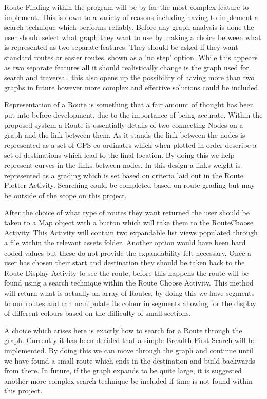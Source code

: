 Route Finding within the program will be by far the most complex feature to implement. This is down to a variety of reasons including having to implement a search technique which performs reliably. Before any graph analysis is done the user should select
 what graph they want to use by making a choice between what is represented as two separate features. They should be asked if they want standard routes or easier routes, shown as a 'no step' option. While this appears as two separate features all it should realistically change is the graph used for search and traversal, this also opens up the possibility of having more than two graphs in future however more complex and effective solutions could be included. 
 
Representation of a Route is something that a fair amount of thought has been put into before development, due to the importance of being accurate. Within the proposed system a Route is essentially details of two connecting Nodes on a graph and the link between them. As it stands the link between the nodes is represented as a set of GPS co ordinates which when plotted in order describe a set of destinations which lead to the final location. By doing this we help represent curves in the links between nodes. In this design a links weight is represented as a grading which is set based on criteria laid out in the Route Plotter Activity. Searching could be completed based on route grading but may be outside of the scope on this project. 
 
After the choice of what type of routes they want returned the user should be taken to a Map object with a button which will take them to the RouteChoose Activity. This Activity will contain two expandable list views populated through a file within the relevant assets folder. Another option would have been hard coded values but these do not provide the expandability felt necessary. Once a user has chosen their start and destination they should be taken back to the Route Display Activity to see the route, before this happens the route will be found using a search technique within the Route Choose Activity. This method will return what is actually an array of Routes, by doing this we have segments to our routes and can manipulate its colour in segments allowing for the display of different colours based on the difficulty of small sections.

A choice which arises here is exactly how to search for a Route through the graph. Currently it has been decided that a simple Breadth First Search will be implemented. By doing this we can move through the graph and continue until we have found a small route which ends in the destination and build backwards from there. In future, if the graph expands to be quite large, it is suggested another more complex search technique be included if time is not found within this project. 

